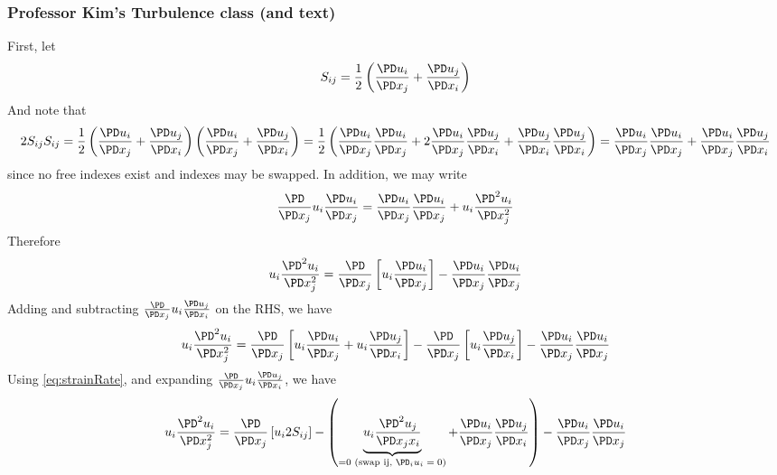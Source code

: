 \documentclass[11pt]{article}
\begin{document}
\subsubsection{Professor Kim's Turbulence class (and text)}
First, let
\begin{equation} \label{eq:strainRate}
	S_{ij} = \frac{1}{2}
	\left(
	\frac{\PD u_i}{\PD x_j} + 
	\frac{\PD u_j}{\PD x_i}
	\right)
\end{equation}
And note that
\begin{equation} \label{eq:strainIdentity}
	2 S_{ij} S_{ij} =
	\frac{1}{2} \left( \frac{\PD u_i}{\PD x_j} + \frac{\PD u_j}{\PD x_i} \right)
	\left( \frac{\PD u_i}{\PD x_j} + \frac{\PD u_j}{\PD x_i} \right)
	= \frac{1}{2} \left( \frac{\PD u_i}{\PD x_j} \frac{\PD u_i}{\PD x_j}
	+ 2 \frac{\PD u_i}{\PD x_j} \frac{\PD u_j}{\PD x_i} 
	+ \frac{\PD u_j}{\PD x_i} \frac{\PD u_j}{\PD x_i} \right)
	= \frac{\PD u_i}{\PD x_j} \frac{\PD u_i}{\PD x_j}
	+ \frac{\PD u_i}{\PD x_j} \frac{\PD u_j}{\PD x_i}
\end{equation}
since no free indexes exist and indexes may be swapped. In addition, we may write
\begin{equation}
	\frac{\PD}{\PD x_j} u_i \frac{\PD u_i}{\PD x_j} =
	\frac{\PD u_i}{\PD x_j}\frac{\PD u_i}{\PD x_j} + 
	u_i \frac{\PD^2 u_i}{\PD x_j^2}
\end{equation}
Therefore
\begin{equation} \label{eq:secondIdentity}
	u_i \frac{\PD^2 u_i}{\PD x_j^2} = 
	\frac{\PD}{\PD x_j} \left[ u_i \frac{\PD u_i}{\PD x_j} \right] - 
	\frac{\PD u_i}{\PD x_j}\frac{\PD u_i}{\PD x_j}
\end{equation}
Adding and subtracting $\frac{\PD}{\PD x_j} u_i \frac{\PD u_j}{\PD x_i}$ on the RHS, we have
\begin{equation}
	u_i \frac{\PD^2 u_i}{\PD x_j^2} = 
	\frac{\PD}{\PD x_j} \left[ u_i \frac{\PD u_i}{\PD x_j} + u_i \frac{\PD u_j}{\PD x_i} \right] - 
	\frac{\PD}{\PD x_j} \left[ u_i \frac{\PD u_j}{\PD x_i} \right] - 
	\frac{\PD u_i}{\PD x_j}\frac{\PD u_i}{\PD x_j}
\end{equation}
Using \ref{eq:strainRate}, and expanding $\frac{\PD}{\PD x_j} u_i \frac{\PD u_j}{\PD x_i}$, we have
\begin{equation}
	u_i \frac{\PD^2 u_i}{\PD x_j^2} = 
	\frac{\PD}{\PD x_j} \left[ u_i 2 S_{ij} \right] - 
	\left( 
	\underbrace{u_i \frac{\PD^2 u_j}{\PD x_j x_i}}_{=0 \text{ (swap ij, $\PD_i u_i =0$)}}
	+
	\frac{\PD u_i}{\PD x_j} \frac{\PD u_j}{\PD x_i}
	\right) - 
	\frac{\PD u_i}{\PD x_j}\frac{\PD u_i}{\PD x_j}
\end{equation}
\end{document}
